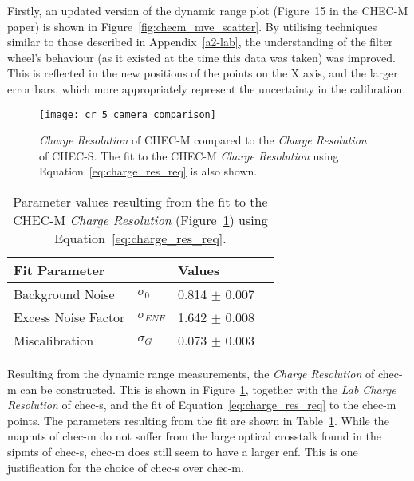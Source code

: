 Firstly, an updated version of the dynamic range plot (Figure~15 in the \mbox{CHEC-M} paper) is shown in Figure~\ref{fig:checm_mve_scatter}. By utilising techniques similar to those described in Appendix~\ref{a2-lab}, the understanding of the filter wheel's behaviour (as it existed at the time this data was taken) was improved. This is reflected in the new positions of the points on the X axis, and the larger error bars, which more appropriately represent the uncertainty in the calibration.

\begin{figure}
	\centering
    \texttt{[image: cr\_5\_camera\_comparison]} 
	\caption[\textit{Charge Resolution} of CHEC-M.]{\textit{Charge Resolution} of CHEC-M compared to the \textit{Charge Resolution} of CHEC-S. The fit to the CHEC-M \textit{Charge Resolution} using Equation~\ref{eq:charge_res_req} is also shown.}
	\label{fig:cr_5_camera_comparison}
\end{figure}

\begin{table}[!ht]
\centering
\begin{tabular}{ll|ll} \toprule
    Fit Parameter        &                & Values             \\ \midrule
    Background Noise     & $\sigma_0$     & 0.814 $\pm$ 0.007  \\
    Excess Noise Factor  & $\sigma_{ENF}$ & 1.642 $\pm$ 0.008  \\
    Miscalibration       & $\sigma_G$     & 0.073 $\pm$ 0.003  \\ \bottomrule
\end{tabular}
\caption{Parameter values resulting from the fit to the CHEC-M \textit{Charge Resolution} (Figure~\ref{fig:cr_5_camera_comparison}) using Equation~\ref{eq:charge_res_req}.}
\label{table:cr_5_camera_comparison}
\end{table}

Resulting from the dynamic range measurements, the \textit{Charge Resolution} of \gls{chec-m} can be constructed. This is shown in Figure~\ref{fig:cr_5_camera_comparison}, together with the \textit{Lab Charge Resolution} of \gls{chec-s}, and the fit of Equation~\ref{eq:charge_res_req} to the \gls{chec-m} points. The parameters resulting from the fit are shown in Table~\ref{table:cr_5_camera_comparison}. While the \glspl{mapmt} of \gls{chec-m} do not suffer from the large optical crosstalk found in the \glspl{sipmt} of \gls{chec-s}, \gls{chec-m} does still seem to have a larger \gls{enf}. This is one justification for the choice of \gls{chec-s} over \gls{chec-m}.